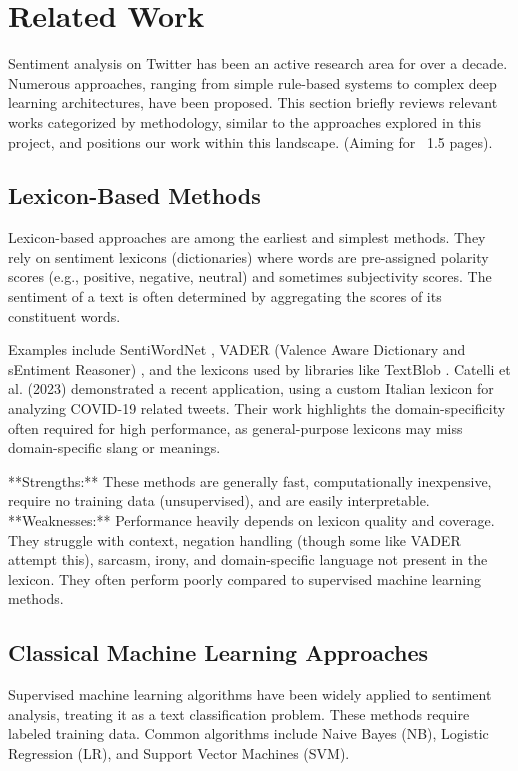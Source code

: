 \documentclass[10pt,twocolumn]{article}
\begin{document}
\section{Related Work}
\label{sec:related_work}
Sentiment analysis on Twitter has been an active research area for over a decade. Numerous approaches, ranging from simple rule-based systems to complex deep learning architectures, have been proposed. This section briefly reviews relevant works categorized by methodology, similar to the approaches explored in this project, and positions our work within this landscape. (Aiming for ~1.5 pages).

\subsection{Lexicon-Based Methods}
Lexicon-based approaches are among the earliest and simplest methods. They rely on sentiment lexicons (dictionaries) where words are pre-assigned polarity scores (e.g., positive, negative, neutral) and sometimes subjectivity scores. The sentiment of a text is often determined by aggregating the scores of its constituent words.

Examples include SentiWordNet \cite{ref:sentiwordnet}, VADER (Valence Aware Dictionary and sEntiment Reasoner) \cite{ref:vader}, and the lexicons used by libraries like TextBlob \cite{ref:textblob}. Catelli et al. (2023) \cite{ref:catelli2023} demonstrated a recent application, using a custom Italian lexicon for analyzing COVID-19 related tweets. Their work highlights the domain-specificity often required for high performance, as general-purpose lexicons may miss domain-specific slang or meanings.

**Strengths:** These methods are generally fast, computationally inexpensive, require no training data (unsupervised), and are easily interpretable.
**Weaknesses:** Performance heavily depends on lexicon quality and coverage. They struggle with context, negation handling (though some like VADER attempt this), sarcasm, irony, and domain-specific language not present in the lexicon. They often perform poorly compared to supervised machine learning methods.

\subsection{Classical Machine Learning Approaches}
Supervised machine learning algorithms have been widely applied to sentiment analysis, treating it as a text classification problem. These methods require labeled training data. Common algorithms include Naive Bayes (NB), Logistic Regression (LR), and Support Vector Machines (SVM).
\end{document}
